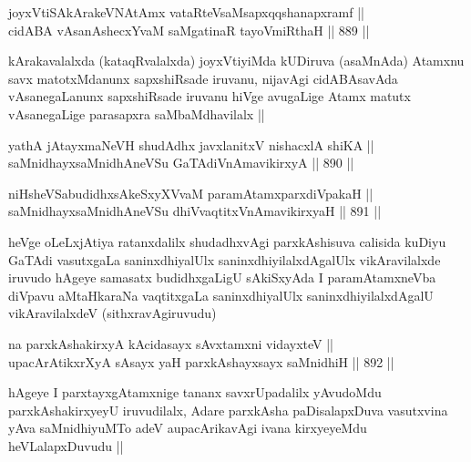 
\begin{shl}
joyxVtiSA\s kArakeVNA\s \s tAmx vataRteV\s saMsapxqqshanapxramf ||  \\
cidABA vAsanAshecxYvaM saMgatinaR tayoVmiRthaH ||  889 ||  
\end{shl}

\begin{artha}
kArakavalalxda (kataqRvalalxda) joyxVtiyiMda kUDiruva (asaMnAda) Atamxnu savx matotxMdanunx sapxshiRsade iruvanu, nijavAgi cidABAsavAda vAsanegaLanunx sapxshiRsade iruvanu hiVge avugaLige Atamx matutx vAsanegaLige parasapxra saMbaMdhavilalx ||
\end{artha}


\begin{shl}
yathA jAtayxmaNeVH shudAdhx javxlanitxV nishacxlA shiKA || \\
saMnidhayxsaMnidhAneVSu GaTAdiVnAmavikirxyA ||  890 ||  
\end{shl}
				
\begin{shl}
niHsheVSabudidhxsAkeSxyXVvaM paramAtamxparxdiVpakaH || \\
saMnidhayxsaMnidhAneVSu dhiVvaqtitxVnAmavikirxyaH ||  891 || 
\end{shl}

\begin{artha}
heVge oLeLxjAtiya ratanxdalilx shudadhxvAgi parxkAshisuva calisida kuDiyu GaTAdi vasutxgaLa saninxdhiyalUlx saninxdhiyilalxdAgalUlx vikAravilalxde iruvudo hAgeye samasatx budidhxgaLigU sAkiSxyAda I paramAtamxneVba diVpavu aMtaHkaraNa vaqtitxgaLa saninxdhiyalUlx saninxdhiyilalxdAgalU vikAravilalxdeV (sithxravAgiruvudu)
\end{artha}

\begin{shl}
na parxkAshakirxyA kAcidasayx sAvxtamxni vidayxteV || \\
upacArAtikxrXyA sA\s sayx yaH parxkAshayxsayx saMnidhiH ||  892 ||  
\end{shl}

\begin{artha}
hAgeye I parxtayxgAtamxnige tananx savxrUpadalilx yAvudoMdu parxkAshakirxyeyU iruvudilalx, Adare parxkAsha paDisalapxDuva vasutxvina yAva saMnidhiyuMTo adeV aupacArikavAgi ivana kirxyeyeMdu heVLalapxDuvudu ||
\end{artha}

